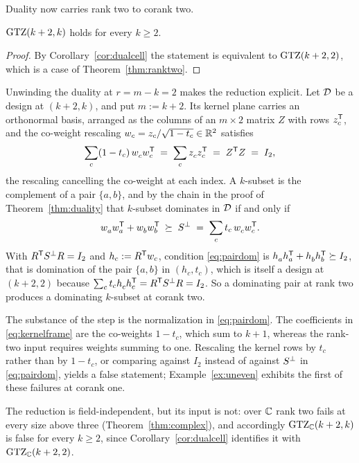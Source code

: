 Duality now carries rank two to corank two.

\begin{theorem}[Lean]\label{thm:coranktwo}
$\mathrm{GTZ}(k+2,k)$ holds for every $k\ge2$.
\end{theorem}

\begin{proof}
By Corollary~\ref{cor:dualcell} the statement is equivalent to
$\mathrm{GTZ}(k+2,2)$, which is a case of Theorem~\ref{thm:ranktwo}.
\end{proof}

Unwinding the duality at $r=m-k=2$ makes the reduction explicit.  Let
$\mathcal{D}$ be a design at $(k+2,k)$, and put $m:=k+2$.  Its kernel plane
carries an orthonormal basis, arranged as the columns of an $m\times2$
matrix $Z$ with rows $z_c^{\mathsf{T}}$, and the co-weight rescaling
$w_c=z_c/\sqrt{1-t_c}\in\mathbb{R}^2$ satisfies
\[
  \sum_c(1-t_c)\,w_c^{\vphantom{\mathsf{T}}}w_c\tp
  \;=\;\sum_cz_c^{\vphantom{\mathsf{T}}}z_c\tp\;=\;Z\tp Z\;=\;I_2 ,
\]
the rescaling cancelling the co-weight at each index.
A $k$-subset is the complement of a pair $\{a,b\}$, and by the chain in
the proof of Theorem~\ref{thm:duality} that $k$-subset dominates in
$\mathcal{D}$ if and only if
\begin{equation}\label{eq:pairdom}
  w_a^{\vphantom{\mathsf{T}}}w_a\tp+w_b^{\vphantom{\mathsf{T}}}w_b\tp
  \;\psd\;\Sdual\;=\;\sum_c t_c\,w_c^{\vphantom{\mathsf{T}}}w_c\tp .
\end{equation}
With $R^{\mathsf{T}}S^{\perp} R=I_2$ and $h_c:=R^{\mathsf{T}} w_c$, condition \eqref{eq:pairdom} is
$h_a^{\vphantom{\mathsf{T}}}h_a\tp+h_b^{\vphantom{\mathsf{T}}}h_b\tp\psd I_2$, that is
domination of the pair $\{a,b\}$ in $(h_c,t_c)$, which is itself a design
at $(k+2,2)$ because $\sum_ct_ch_c^{\vphantom{\mathsf{T}}}h_c\tp
=R\tp\Sdual R=I_2$.
So a dominating pair at rank two produces a dominating $k$-subset at
corank two.

The substance of the step is the normalization in \eqref{eq:pairdom}.
The coefficients in \eqref{eq:kernelframe} are the co-weights $1-t_c$,
which sum to $k+1$, whereas the rank-two input requires weights summing to
one.  Rescaling the kernel rows by $t_c$ rather than by $1-t_c$, or
comparing against $I_2$ instead of against $S^{\perp}$ in \eqref{eq:pairdom},
yields a false statement; Example~\ref{ex:uneven} exhibits the first of
these failures at corank one.

The reduction is field-independent, but its input is not: over $\mathbb{C}$ rank
two fails at every size above three (Theorem~\ref{thm:complex}), and
accordingly $\mathrm{GTZ}_{\mathbb{C}}(k+2,k)$ is false for every $k\ge2$, since
Corollary~\ref{cor:dualcell} identifies it with $\mathrm{GTZ}_{\mathbb{C}}(k+2,2)$.

